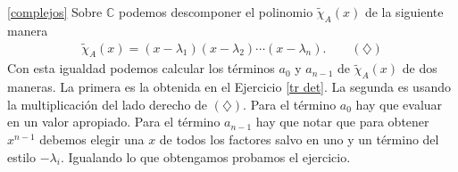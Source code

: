 \documentclass[a4paper,12pt,twoside,spanish,reqno]{amsbook}
\numberwithin{equation}{section}
\begin{document}
\ref{complejos} Sobre $\mathbb{C}$ podemos descomponer el polinomio $\tilde\chi_A(x)$ de la siguiente manera
\begin{align*}
\tilde\chi_A(x)=(x-\lambda_1)(x-\lambda_2)\cdots(x-\lambda_n). \qquad (\diamondsuit)
\end{align*}
Con esta igualdad podemos calcular los términos $a_0$ y $a_{n-1}$ de $\tilde\chi_A(x)$ de dos maneras. La primera es la obtenida en el Ejercicio \ref{tr det}. La segunda es usando la multiplicación del lado derecho de $(\diamondsuit)$. Para el término $a_0$ hay que evaluar en un valor apropiado. Para el término $a_{n-1}$ hay que notar que para obtener $x^{n-1}$ debemos elegir una $x$ de todos los factores salvo en uno y un término del estilo $-\lambda_i$. Igualando lo que obtengamos probamos el ejercicio.
\end{document}
